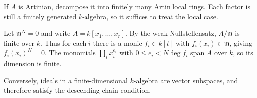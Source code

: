 If $A$ is Artinian, decompose it into finitely many Artin local rings. Each factor is still a finitely generated $k$-algebra, so it suffices to treat the local case.

Let $\mathfrak m^N=0$ and write $A=k[x_1,\ldots,x_r]$. By the weak Nullstellensatz, $A/\mathfrak m$ is finite over $k$. Thus for each $i$ there is a monic $f_i\in k[t]$ with $f_i(x_i)\in\mathfrak m$, giving $f_i(x_i)^N=0$. The monomials $\prod_i x_i^{e_i}$ with $0\leq e_i<N\deg f_i$ span $A$ over $k$, so its dimension is finite.

Conversely, ideals in a finite-dimensional $k$-algebra are vector subspaces, and therefore satisfy the descending chain condition.
